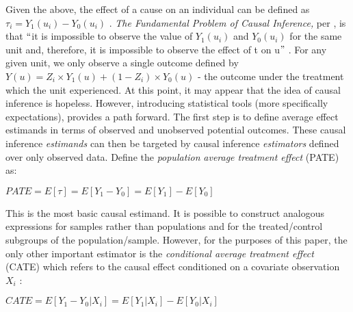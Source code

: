 \documentclass[../main.tex]{subfiles}
\begin{document}
\vspace{\baselineskip}
Given the above, the effect of a cause on an individual can be defined as  \(  \tau_{i}=Y_{1} \left( u_{i} \right)  - Y_{0} \left( u_{i} \right)   \) . \textit{The Fundamental Problem of Causal Inference,} per \textcite{Holland1986StatisticsInference}, is that $``$it is impossible to observe the value of  \( Y_{1} \left( u_{i} \right)  \)  and  \( Y_{0} \left( u_{i} \right)  \) for the same unit and, therefore, it is impossible to observe the effect of t on u$"$ . For any given unit, we only observe a single outcome defined by  \( Y \left( u \right)  =Z_{i} \times Y_{1} \left( u \right) + \left( 1-Z_{i} \right)  \times Y_{0} \left( u \right)  \) - the outcome under the treatment which the unit experienced. At this point, it may appear that the idea of causal inference is hopeless. However, introducing statistical tools (more specifically expectations), provides a path forward. The first step is to define average effect estimands in terms of observed and unobserved potential outcomes. These causal inference \textit{estimands} can then be targeted by causal inference \textit{estimators }defined over only observed data. Define the \textit{population} \textit{average treatment effect }(PATE) as:\par


\vspace{\baselineskip}
\begin{adjustwidth}{0.5in}{0.0in}
 \( PATE = E \left[  \tau \right]  = E \left[ Y_{1} - Y_{0} \right]  = E \left[ Y_{1} \right]  - E \left[ Y_{0} \right]  \) \par

\end{adjustwidth}


\vspace{\baselineskip}
This is the most basic causal estimand. It is possible to construct analogous expressions for samples rather than populations and for the treated/control subgroups of the population/sample. However, for the purposes of this paper, the only other important estimator is the \textit{conditional average treatment effect }(CATE) which refers to the causal effect conditioned on a covariate observation  \( X_{i} \) :\par


\vspace{\baselineskip}
\begin{adjustwidth}{0.5in}{0.0in}
 \( CATE= E \left[ Y_{1} - Y_{0}  \vert  X_{i} \right]  =E \left[ Y_{1}  \vert  X_{i} \right]  - E \left[  Y_{0}  \vert  X_{i} \right]  \) \par

\end{adjustwidth}
\end{document}
